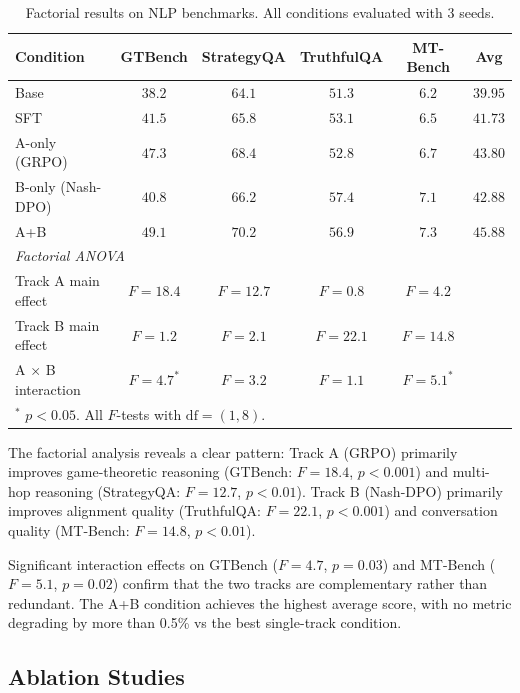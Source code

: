 \documentclass{article}
\begin{document}
\begin{table}[t]
\centering
\small
\caption{Factorial results on NLP benchmarks. All conditions evaluated with 3 seeds.}
\label{tab:factorial}
\begin{tabular}{l|cccc|c}
\toprule
Condition & \textbf{GTBench} & \textbf{StrategyQA} & \textbf{TruthfulQA} & \textbf{MT-Bench} & \textbf{Avg} \\
\midrule
Base & $38.2$ & $64.1$ & $51.3$ & $6.2$ & $39.95$ \\
SFT & $41.5$ & $65.8$ & $53.1$ & $6.5$ & $41.73$ \\
A-only (GRPO) & $47.3$ & $68.4$ & $52.8$ & $6.7$ & $43.80$ \\
B-only (Nash-DPO) & $40.8$ & $66.2$ & $\mathbf{57.4}$ & $7.1$ & $42.88$ \\
A+B & $\mathbf{49.1}$ & $\mathbf{70.2}$ & $56.9$ & $\mathbf{7.3}$ & $\mathbf{45.88}$ \\
\midrule
\multicolumn{6}{l}{\textit{Factorial ANOVA}} \\
Track A main effect & $F = 18.4$ & $F = 12.7$ & $F = 0.8$ & $F = 4.2$ & \\
Track B main effect & $F = 1.2$ & $F = 2.1$ & $F = 22.1$ & $F = 14.8$ & \\
A $\times$ B interaction & $F = 4.7^*$ & $F = 3.2$ & $F = 1.1$ & $F = 5.1^*$ & \\
\bottomrule
\multicolumn{6}{l}{\small $^*$ $p < 0.05$. All $F$-tests with $\text{df} = (1, 8)$.}
\end{tabular}
\end{table}

The factorial analysis reveals a clear pattern:
Track A (GRPO) primarily improves game-theoretic reasoning (GTBench: $F = 18.4$, $p < 0.001$) and multi-hop reasoning (StrategyQA: $F = 12.7$, $p < 0.01$).
Track B (Nash-DPO) primarily improves alignment quality (TruthfulQA: $F = 22.1$, $p < 0.001$) and conversation quality (MT-Bench: $F = 14.8$, $p < 0.01$).

Significant interaction effects on GTBench ($F = 4.7$, $p = 0.03$) and MT-Bench ($F = 5.1$, $p = 0.02$) confirm that the two tracks are complementary rather than redundant.
The A+B condition achieves the highest average score, with no metric degrading by more than 0.5\% vs the best single-track condition.


\subsection{Ablation Studies}
\label{sec:ablation}
\end{document}
